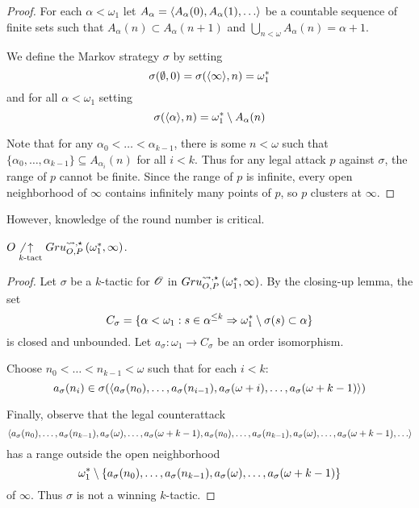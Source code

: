 \begin{proof}
  For each $\alpha<\omega_1$ let $A_\alpha=\<A_\alpha(0),A_\alpha(1),\dots\>$
  be a countable sequence of finite sets such that
  $A_\alpha(n)\subset A_\alpha(n+1)$ and
  $\bigcup_{n<\omega}A_\alpha(n)=\alpha+1$.

  We define the Markov strategy $\sigma$ by setting
    \[
      \sigma(\emptyset,0) = \sigma(\langle\infty\rangle,n) = \omega^*_1
    \]
  and for all $\alpha<\omega_1$ setting
    \[
      \sigma(\langle\alpha\rangle,n) = \omega^*_1 \setminus A_\alpha(n)
    \]

  Note that for any $\alpha_0<\dots<\alpha_{k-1}$, there is some $n<\omega$
  such that
  $\{\alpha_0,\dots,\alpha_{k-1}\}\subseteq A_{\alpha_i}(n)$ for all $i<k$.
  Thus for any legal attack $p$ against $\sigma$, the range of $p$ cannot
  be finite. Since the range of $p$ is infinite, every open neighborhood of
  $\infty$ contains infinitely many points of $p$, so $p$ clusters at $\infty$.
\end{proof}

However, knowledge of the round number is critical.

\begin{thm}
  $O\not\underset{k\text{-tact}}{\uparrow}Gru_{O,P}^{\leadsto,\star}\left({\omega^*_1},{\infty}\right)$.
\end{thm}

\begin{proof}
  Let $\sigma$ be a $k$-tactic for $\mathscr{O}$ in
  $Gru_{O,P}^{\leadsto,\star}\left({\omega^*_1},{\infty}\right)$. By the closing-up lemma, the set
    \[
      C_\sigma
        =
      \{
        \alpha<\omega_1
          :
        s\in\alpha^{\leq k}
          \Rightarrow
        \omega^*_1\setminus\sigma(s)
        \subset \alpha
      \}
    \]
  is closed and unbounded. Let $a_\sigma:\omega_1\to C_\sigma$ be an order
  isomorphism.

  Choose $n_0<\dots<n_{k-1}<\omega$ such that for each $i<k$:
    \[
      a_\sigma(n_i)
        \in
      \sigma(
        \langle a_\sigma(n_0),\dots,a_\sigma(n_{i-1}),
          a_\sigma(\omega+i),\dots,a_\sigma(\omega+k-1)\rangle
      )
    \]

  Finally, observe that the legal counterattack
    \[
      \<a_\sigma(n_0),\dots,a_\sigma(n_{k-1}),
        a_\sigma(\omega),\dots,a_\sigma(\omega+k-1),
        a_\sigma(n_0),\dots,a_\sigma(n_{k-1}),
        a_\sigma(\omega),\dots,a_\sigma(\omega+k-1),
        \dots\>
    \]
  has a range outside the open neighborhood %
    \[
      \omega^*_1
        \setminus
      \{a_\sigma(n_0),\dots,a_\sigma(n_{k-1}),
        a_\sigma(\omega),\dots,a_\sigma(\omega+k-1)\}
    \]
  of $\infty$. Thus $\sigma$ is not a winning $k$-tactic.
\end{proof}


